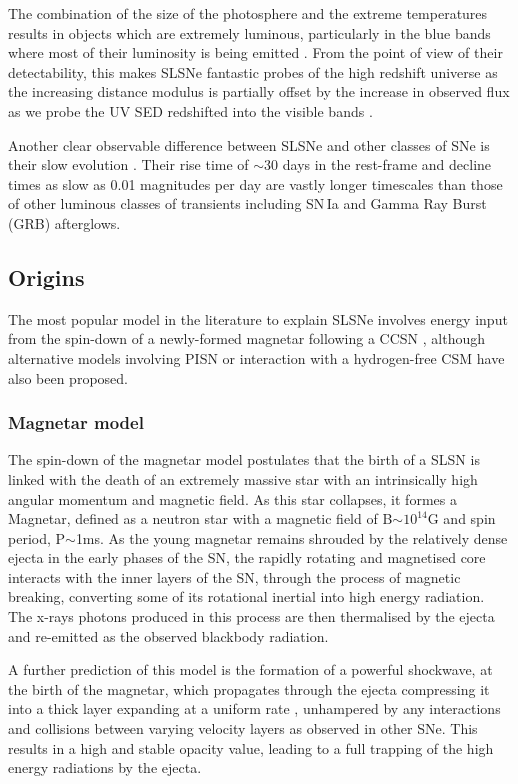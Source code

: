 The combination of the size of the photosphere and the extreme temperatures results in objects which are extremely luminous, particularly in the blue bands where most of their luminosity is being emitted \citep{Yan2017}. From the point of view of their detectability, this makes SLSNe fantastic probes of the high redshift universe as the increasing distance modulus is partially offset by the increase in observed flux as we probe the UV SED redshifted into the visible bands \citep{Smith2018}.

Another clear observable difference between SLSNe and other classes of SNe is their slow evolution \citep{Gal-Yam2009, Inserra2013, Nicholl2015a}. Their rise time of $\sim$30 days in the rest-frame and decline times as slow as 0.01 magnitudes per day are vastly longer timescales than those of other luminous classes of transients including SN\,Ia and Gamma Ray Burst (GRB) afterglows.

\subsection{Origins} \label{sec:Origins}
The most popular model in the literature to explain SLSNe involves energy input from the spin-down of a newly-formed magnetar following a CCSN \citep{Kasen2009,Woosley2010,Inserra2013}, although alternative models involving PISN \citep{Woosley2007,Yan2015} or interaction with a hydrogen-free CSM \citep{Chevalier2011,Chatzopoulos2013,Sorokina2015} have also been proposed.

\subsubsection{Magnetar model}
The spin-down of the magnetar model postulates that the birth of a SLSN is linked with the death of an extremely massive star with an intrinsically high angular momentum and magnetic field. As this star collapses, it formes a Magnetar, defined as a neutron star with a magnetic field of B$\sim10^{14}$G and spin period, P$\sim$1ms. As the young magnetar remains shrouded by the relatively dense ejecta in the early phases of the SN, the rapidly rotating and magnetised core interacts with the inner layers of the SN, through the process of magnetic breaking, converting some of its rotational inertial into high energy radiation. The x-rays photons produced in this process are then thermalised by the ejecta and re-emitted as the observed blackbody radiation.

A further prediction of this model is the formation of a powerful shockwave, at the birth of the magnetar, which propagates through the ejecta compressing it into a thick layer \citep{Jerkstrand2016,Chen2018} expanding at a uniform rate \citep{Inserra2013}, unhampered by any interactions and collisions between varying velocity layers as observed in other SNe. This results in a high and stable opacity value, leading to a full trapping of the high energy radiations by the ejecta.

